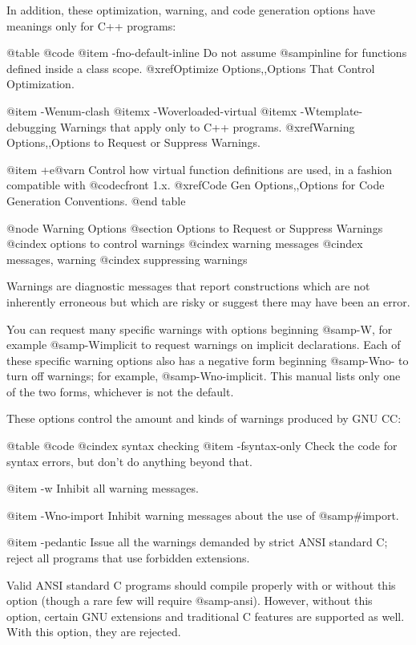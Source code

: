 {In addition, these optimization, warning, and code generation options
have meanings only for C++ programs:

@table @code
@item -fno-default-inline
Do not assume @samp{inline} for functions defined inside a class scope.
@xref{Optimize Options,,Options That Control Optimization}.

@item -Wenum-clash
@itemx -Woverloaded-virtual
@itemx -Wtemplate-debugging
Warnings that apply only to C++ programs.  @xref{Warning
Options,,Options to Request or Suppress Warnings}.

@item +e@var{n}
Control how virtual function definitions are used, in a fashion
compatible with @code{cfront} 1.x.  @xref{Code Gen Options,,Options for
Code Generation Conventions}.
@end table

@node Warning Options
@section Options to Request or Suppress Warnings
@cindex options to control warnings
@cindex warning messages
@cindex messages, warning
@cindex suppressing warnings

Warnings are diagnostic messages that report constructions which
are not inherently erroneous but which are risky or suggest there
may have been an error.

You can request many specific warnings with options beginning @samp{-W},
for example @samp{-Wimplicit} to request warnings on implicit
declarations.  Each of these specific warning options also has a
negative form beginning @samp{-Wno-} to turn off warnings;
for example, @samp{-Wno-implicit}.  This manual lists only one of the
two forms, whichever is not the default.

These options control the amount and kinds of warnings produced by GNU
CC:

@table @code
@cindex syntax checking
@item -fsyntax-only
Check the code for syntax errors, but don't do anything beyond that.

@item -w
Inhibit all warning messages.

@item -Wno-import
Inhibit warning messages about the use of @samp{#import}.

@item -pedantic
Issue all the warnings demanded by strict ANSI standard C; reject
all programs that use forbidden extensions.  

Valid ANSI standard C programs should compile properly with or without
this option (though a rare few will require @samp{-ansi}).  However,
without this option, certain GNU extensions and traditional C features
are supported as well.  With this option, they are rejected.

}
